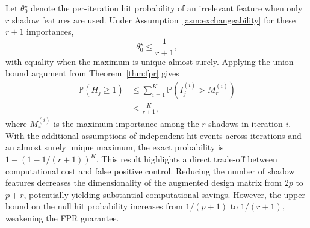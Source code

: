 \documentclass[runningheads]{llncs}
\begin{document}


Let \(\theta_0^\star\) denote the per-iteration hit probability of an irrelevant feature when only \(r\) shadow features are used. Under Assumption~\ref{asm:exchangeability} for these \(r+1\) importances,
\[
\theta_0^\star \leq \frac{1}{r+1},
\]
with equality when the maximum is unique almost surely. Applying the union-bound argument from Theorem~\ref{thm:fpr} gives
\begin{align}
\label{eqn:fpr_upper_bound}
\mathbb{P}(H_j \geq 1)
&\leq \sum_{i=1}^{K}\mathbb{P}\!\left(I_j^{(i)}>M_r^{(i)}\right) \nonumber\\
&\leq \frac{K}{r+1},
\end{align}
where $M_r^{(i)}$ is the maximum importance among the $r$ shadows in iteration $i$. With the additional assumptions of independent hit events across iterations and an almost surely unique maximum, the exact probability is $1-(1-1/(r+1))^K$.
This result highlights a direct trade-off between computational cost and false positive control. Reducing the number of shadow features decreases the dimensionality of the augmented design matrix from \(2p\) to \(p+r\), potentially yielding substantial computational savings. However, the upper bound on the null hit probability increases from \(1/(p+1)\) to \(1/(r+1)\), weakening the FPR guarantee.
\end{document}
